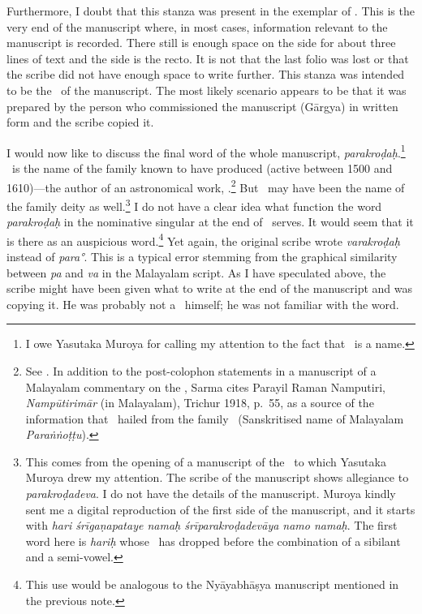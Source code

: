 Furthermore, I doubt that this stanza was present in the exemplar of \Tm. This is the very end of the manuscript where, in most cases, information relevant to the manuscript is recorded. There still is enough space on the side for about three lines of text and the side is the recto. It is not that the last folio was lost or that the scribe did not have enough space to write further. This stanza was intended to be the \colophon\ of the manuscript. The most likely scenario appears to be that it was prepared by the person who commissioned the manuscript (Gārgya) in written form and the scribe copied it.

I would now like to discuss the final word of the whole manuscript, \emph{pa\-ra\-kro\-ḍaḥ}.\footnote{I owe Yasutaka Muroya for calling my attention to the fact that \Parakroda\ is a name.} \Parakroda\ is the name of the family known to have produced \Jyesthadeva{} (active between 1500 and 1610)---the author of an astronomical work, \Yuktibhasa.\footnote{See \citet[187--188, and 207]{kvsarma:1991}. In addition to the post-colophon statements in a manuscript of a Malayalam commentary on the \Suryasiddhanta, Sarma cites Parayil Raman Namputiri, \emph{Nampūtirimār} (in Malayalam), Trichur 1918, p.~55, as a source of the information that \Jyesthadeva\ hailed from the family \Parakroda\ (Sanskritised name of Malayalam \emph{Paraṅṅoṭṭu}).} But \Parakroda\ may have been the name of the family deity as well.\footnote{This comes from the opening of a manuscript of the \Nyayabhasya\ to which Yasutaka Muroya drew my attention. The scribe of the manuscript shows allegiance to \emph{parakroḍadeva}. I do not have the details of the manuscript. Muroya kindly sent me a digital reproduction of the first side of the manuscript, and it starts with \emph{hari śrīgaṇapataye namaḥ śrīparakroḍadevāya namo namaḥ}. The first word here is \emph{hariḥ} whose \visarga\ has dropped before the combination of a sibilant and a semi-vowel.} I do not have a clear idea what function the word \emph{parakroḍaḥ} in the nominative singular at the end of \Tm\ serves. It would seem that it is there as an auspicious word.\footnote{This use would be analogous to the Nyāyabhāṣya manuscript mentioned in the previous note.} Yet again, the original scribe wrote \emph{varakroḍaḥ} instead of \emph{para°}. This is a typical error stemming from the graphical similarity between \emph{pa} and \emph{va} in the Malayalam script. As I have speculated above, the scribe might have been given what to write at the end of the manuscript and was copying it. He was probably not a \Parakroda\ himself; he was not familiar with the word.

